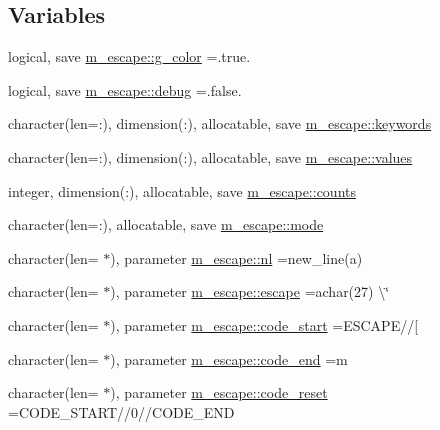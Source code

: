 \subsection*{Variables}
\begin{DoxyCompactItemize}
\item 
logical, save \mbox{\hyperlink{namespacem__escape_a67ff4e5b90da8436f0da5882c4a5720c}{m\+\_\+escape\+::g\+\_\+color}} =.true.
\item 
logical, save \mbox{\hyperlink{namespacem__escape_af068eb2561159352a9a406c95157b131}{m\+\_\+escape\+::debug}} =.false.
\item 
character(len=\+:), dimension(\+:), allocatable, save \mbox{\hyperlink{namespacem__escape_a35e957e007844dbfe641b3d915fba048}{m\+\_\+escape\+::keywords}}
\item 
character(len=\+:), dimension(\+:), allocatable, save \mbox{\hyperlink{namespacem__escape_a4c3b430bde66148e6f2c79c5418384fa}{m\+\_\+escape\+::values}}
\item 
integer, dimension(\+:), allocatable, save \mbox{\hyperlink{namespacem__escape_a7e8e011813de1e58d7c8bcda489d8f1c}{m\+\_\+escape\+::counts}}
\item 
character(len=\+:), allocatable, save \mbox{\hyperlink{namespacem__escape_ab4e7fcb41457772a9bd4e4413d5355d6}{m\+\_\+escape\+::mode}}
\item 
character(len= $\ast$), parameter \mbox{\hyperlink{namespacem__escape_aa17be0f87e5ec9012a38c04bfbb5e588}{m\+\_\+escape\+::nl}} =new\+\_\+line(\textquotesingle{}a\textquotesingle{})
\item 
character(len= $\ast$), parameter \mbox{\hyperlink{namespacem__escape_a9931f535eb0f6f24df5a121331faa5ef}{m\+\_\+escape\+::escape}} =achar(27) \textbackslash{}\char`\"{}
\item 
character(len= $\ast$), parameter \mbox{\hyperlink{namespacem__escape_a6d5af6b1571cba22511523c53c71fa6f}{m\+\_\+escape\+::code\+\_\+start}} =E\+S\+C\+A\+PE//\textquotesingle{}\mbox{[}\textquotesingle{}
\item 
character(len= $\ast$), parameter \mbox{\hyperlink{namespacem__escape_af913c326395b9bf2c089c30698d2c742}{m\+\_\+escape\+::code\+\_\+end}} =\textquotesingle{}m\textquotesingle{}
\item 
character(len= $\ast$), parameter \mbox{\hyperlink{namespacem__escape_aaaf7224f2104dcd571cdaa69b61b9d01}{m\+\_\+escape\+::code\+\_\+reset}} =C\+O\+D\+E\+\_\+\+S\+T\+A\+RT//\textquotesingle{}0\textquotesingle{}//C\+O\+D\+E\+\_\+\+E\+ND
\item 

\end{DoxyCompactItemize}
